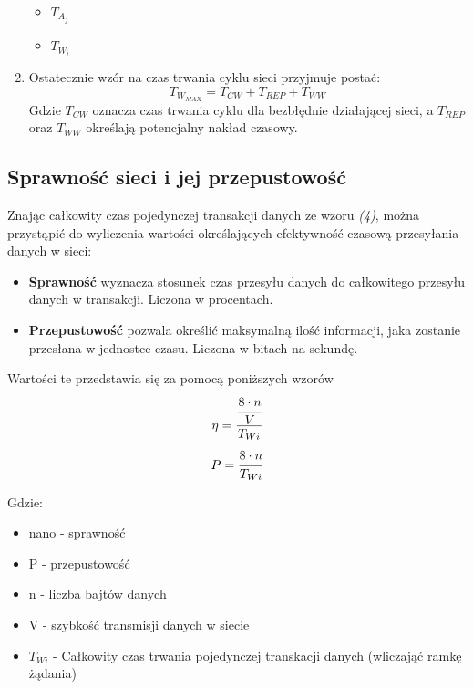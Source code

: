 \documentclass[a4paper,twoside]{article}
\begin{document}
\begin{enumerate}
\begin{itemize}
			\item $ T_{A_j} $ 
			\item $ T_{W_i} $ 
		\end{itemize}
		\item Ostatecznie wzór na czas trwania cyklu sieci przyjmuje postać:
		\begin{equation}
			T_{W_{MAX}}=T_{CW}+T_{REP}+T_{WW}
		\end{equation}
		Gdzie $ T_{CW} $ oznacza czas trwania cyklu dla bezbłędnie działającej sieci, a $ T_{REP} $ oraz $ T_{WW} $ określają potencjalny nakład czasowy.
	\end{enumerate}



	\subsection{Sprawność sieci i jej przepustowość}
	Znając całkowity czas pojedynczej transakcji danych ze wzoru \textit{(4)}, można przystąpić do wyliczenia wartości określających efektywność czasową przesyłania danych w sieci:
	\begin{itemize}
		\item \textbf{Sprawność} wyznacza stosunek czas przesyłu danych do całkowitego przesyłu danych w transakcji. Liczona w procentach.
		\item \textbf{Przepustowość} pozwala określić maksymalną ilość informacji, jaka zostanie przesłana w jednostce czasu. Liczona w bitach na sekundę.
	\end{itemize}
	
	Wartości te przedstawia się za pomocą poniższych wzorów
	\begin{equation}
	\eta = \cfrac{\cfrac{8\cdot n}{V}}{T_{Wi}}   
	\end{equation}
	\begin{equation}
	P = \cfrac{8\cdot n}{T_{Wi}}
	\end{equation}
	
	Gdzie:
	\begin{itemize}
		\item nano - sprawność
		\item P - przepustowość
		\item n - liczba bajtów danych
		\item V - szybkość transmisji danych w siecie
		\item $ T_{Wi} $ - Całkowity czas trwania pojedynczej transkacji danych (wliczająć ramkę żądania)
	\end{itemize}
	
\end{document}
